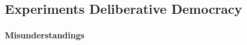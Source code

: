 \documentclass[11pt,a4paper,oneside,english]{article}
\begin{document}
\subsection[Deliberative Experiments]{Experiments Deliberative Democracy} \label{sec:deliberative-experiments}





\paragraph{Misunderstandings}


\end{document}
